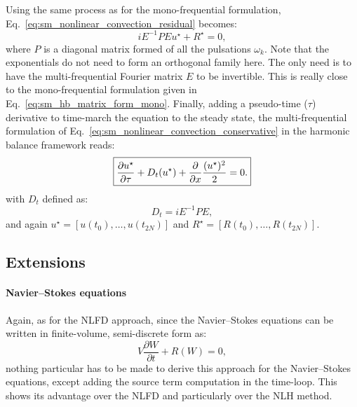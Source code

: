 Using the same process as for the mono-frequential formulation,
Eq.~\eqref{eq:sm_nonlinear_convection_residual} becomes:
\begin{equation}
	i E^{-1} P E u^\star + R^\star = 0,
\end{equation}
where $P$ is a diagonal matrix formed of all the pulsations $\omega_k$.
Note that the exponentials do not need to form an
orthogonal family here. The only need is to have the multi-frequential
Fourier matrix $E$ to be invertible.
This is really close to the mono-frequential formulation given
in Eq.~\eqref{eq:sm_hb_matrix_form_mono}.
Finally, adding a pseudo-time ($\tau$) derivative 
to time-march the equation to the steady state,
the multi-frequential formulation of 
Eq.~\eqref{eq:sm_nonlinear_convection_conservative} in the harmonic
balance framework reads:
\begin{equation}
	\fbox{$
	\displaystyle \frac{\partial u^\star}{\partial \tau} +
	D_t (u^\star) + 
	\displaystyle \frac{\partial}{\partial x}
		\frac{(u^\star)^2}{2} = 0.
	$}
\end{equation}
with $D_t$ defined as:
\begin{equation}
	D_t = i E^{-1} P E,
	\label{eq:sm_multi_spectral_operator}
\end{equation}
and again $u^\star = [u(t_0), \ldots, u(t_{2N})]$ 
and $R^\star = [R(t_0), \ldots, R(t_{2N})]$.

\subsection{Extensions}

\paragraph{Navier--Stokes equations}
Again, as for the NLFD approach, since the 
Navier--Stokes equations can be written in finite-volume,
semi-discrete form as:
\begin{equation}
	V \frac{\partial W}{\partial t} + R(W) = 0,
\end{equation}
nothing particular has to be made to derive this approach for
the Navier--Stokes equations, except adding the source term computation
in the time-loop.
This shows its advantage over the NLFD and particularly over the NLH method.

